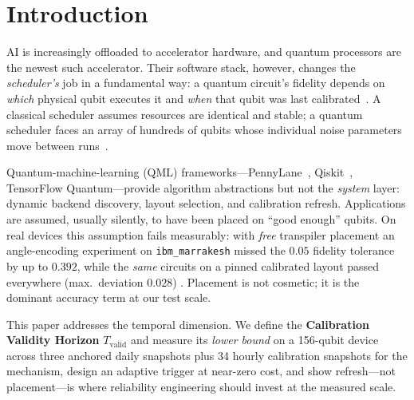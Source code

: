 \documentclass[journal,10pt,twocolumn]{IEEEtran}
\begin{document}
\section{Introduction}
 AI is increasingly offloaded to accelerator hardware, and quantum processors are the
newest such accelerator. Their software stack, however, changes the \emph{scheduler's} job in a fundamental way: a
quantum circuit's fidelity depends on \emph{which} physical qubit executes it and \emph{when} that qubit was last
calibrated~\cite{preskill2018,arute2019,murali2019noise,li2019sabre}. A classical scheduler assumes resources are
identical and stable; a quantum scheduler faces an array of hundreds of qubits whose individual noise parameters
move between runs~\cite{ibmcalib,kanazawa2021,vanberg2023}.

Quantum-machine-learning (QML) frameworks---PennyLane~\cite{berholm2018}, Qiskit~\cite{qiskit}, TensorFlow
Quantum---provide algorithm abstractions but not the \emph{system} layer: dynamic backend discovery, layout
selection, and calibration refresh. Applications are assumed, usually silently, to have been placed on ``good
enough'' qubits. On real devices this assumption fails measurably: with \emph{free} transpiler placement an
angle-encoding experiment on \texttt{ibm\_marrakesh} missed the $0.05$ fidelity tolerance by up to $0.392$,
while the \emph{same} circuits on a pinned calibrated layout passed everywhere (max.\ deviation $0.028$)
\cite{tangpu}. Placement is not cosmetic; it is the dominant accuracy term at our test scale.

This paper addresses the temporal dimension. We define the \textbf{Calibration Validity
Horizon} $T_{\mathrm{valid}}$ and measure its \emph{lower bound} on a 156-qubit device across three anchored daily
snapshots plus 34 hourly calibration snapshots for the mechanism, design an adaptive trigger at near-zero cost, and
show refresh---not placement---is where reliability engineering should invest at the measured scale.
\end{document}
